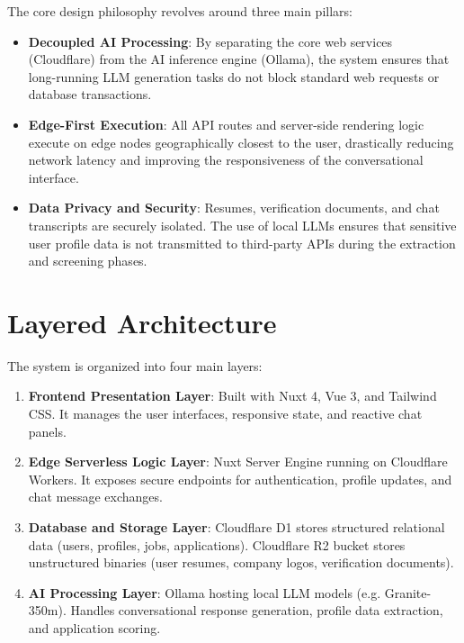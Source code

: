 \documentclass[12pt,a4paper]{report}
\begin{document}
The core design philosophy revolves around three main pillars:
\begin{itemize}
    \item \textbf{Decoupled AI Processing}: By separating the core web services (Cloudflare) from the AI inference engine (Ollama), the system ensures that long-running LLM generation tasks do not block standard web requests or database transactions.
    \item \textbf{Edge-First Execution}: All API routes and server-side rendering logic execute on edge nodes geographically closest to the user, drastically reducing network latency and improving the responsiveness of the conversational interface.
    \item \textbf{Data Privacy and Security}: Resumes, verification documents, and chat transcripts are securely isolated. The use of local LLMs ensures that sensitive user profile data is not transmitted to third-party APIs during the extraction and screening phases.
\end{itemize}

\newpage
\section{Layered Architecture}

The system is organized into four main layers:
\begin{enumerate}
    \item \textbf{Frontend Presentation Layer}: Built with Nuxt 4, Vue 3, and Tailwind CSS. It manages the user interfaces, responsive state, and reactive chat panels.
    \item \textbf{Edge Serverless Logic Layer}: Nuxt Server Engine running on Cloudflare Workers. It exposes secure endpoints for authentication, profile updates, and chat message exchanges.
    \item \textbf{Database and Storage Layer}: Cloudflare D1 stores structured relational data (users, profiles, jobs, applications). Cloudflare R2 bucket stores unstructured binaries (user resumes, company logos, verification documents).
    \item \textbf{AI Processing Layer}: Ollama hosting local LLM models (e.g. Granite-350m). Handles conversational response generation, profile data extraction, and application scoring.
\end{enumerate}
\end{document}
